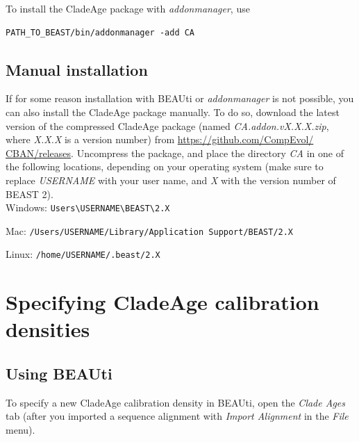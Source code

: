 \documentclass{article}
\begin{document}
\noindent
To install the CladeAge package with \emph{addonmanager}, use

\footnotesize
\begin{verbatim}
PATH_TO_BEAST/bin/addonmanager -add CA
\end{verbatim}
\normalsize

\subsection{Manual installation}

If for some reason installation with BEAUti or \emph{addonmanager} is not possible, you can also install the CladeAge package manually. To do so, download the latest version of the compressed CladeAge package (named \emph{CA.addon.vX.X.X.zip}, where \emph{X.X.X} is a version number) from \href{https://github.com/CompEvol/CBAN/releases}{https://github.com/CompEvol/ \linebreak CBAN/releases}. Uncompress the package, and place the directory \emph{CA} in one of the following locations, depending on your operating system (make sure to replace \emph{USERNAME} with your user name, and \emph{X} with the version number of BEAST 2).\\

\noindent
Windows: \footnotesize\verb!Users\USERNAME\BEAST\2.X!\normalsize

\noindent
Mac: \footnotesize\verb!/Users/USERNAME/Library/Application Support/BEAST/2.X!\normalsize

\noindent
Linux: \footnotesize\verb!/home/USERNAME/.beast/2.X!\normalsize


\section{Specifying CladeAge calibration densities}

\subsection{Using BEAUti}

To specify a new CladeAge calibration density in BEAUti, open the \emph{Clade Ages} tab (after you imported a sequence alignment with \emph{Import Alignment} in the \emph{File} menu).
\end{document}
